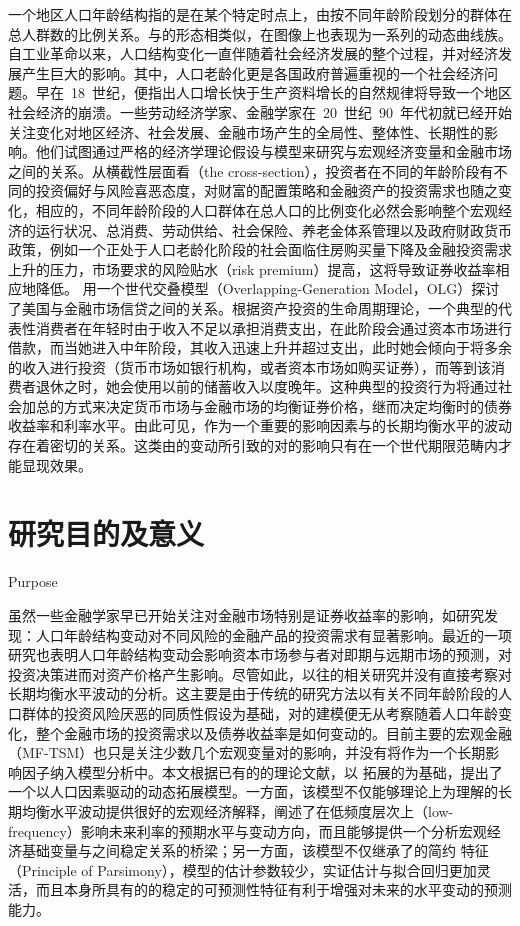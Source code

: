 一个地区人口年龄结构指的是在某个特定时点上，由按不同年龄阶段划分的群体在总人群数的比例关系。与\ts 的形态相类似，\ds 在图像上也表现为一系列的动态曲线族。自工业革命以来，人口结构变化一直伴随着社会经济发展的整个过程，并对经济发展产生巨大的影响。其中，人口老龄化更是各国政府普遍重视的一个社会经济问题。早在~18~世纪，便指出人口增长快于生产资料增长的自然规律将导致一个地区社会经济的崩溃。一些劳动经济学家、金融学家在~20~世纪~90~年代初就已经开始关注\ds 变化对地区经济、社会发展、金融市场产生的全局性、整体性、长期性的影响。他们试图通过严格的经济学理论假设与模型来研究\ds 与宏观经济变量和金融市场之间的关系。从横截性层面看（the cross-section），投资者在不同的年龄阶段有不同的投资偏好与风险喜恶态度，对财富的配置策略和金融资产的投资需求也随之变化，相应的，不同年龄阶段的人口群体在总人口的比例变化必然会影响整个宏观经济的运行状况、总消费、劳动供给、社会保险、养老金体系管理以及政府财政货币政策，例如一个正处于人口老龄化阶段的社会面临住房购买量下降及金融投资需求上升的压力，市场要求的风险贴水（risk premium）提高，这将导致证券收益率相应地降低\citep{bakshi1994baby}。 用一个世代交叠模型（Overlapping-Generation Model，OLG）探讨了美国\ds 与金融市场信贷之间的关系。根据资产投资的生命周期理论\citep{modigliani1954utility}，一个典型的代表性消费者在年轻时由于收入不足以承担消费支出，在此阶段会通过资本市场进行借款，而当她进入中年阶段，其收入迅速上升并超过支出，此时她会倾向于将多余的收入进行投资（货币市场如银行机构，或者资本市场如购买证券），而等到该消费者退休之时，她会使用以前的储蓄收入以度晚年。这种典型的投资行为将通过社会加总的方式来决定货币市场与金融市场的均衡证券价格，继而决定均衡时的债券收益率和利率水平。由此可见，\ds 作为一个重要的影响因素与\ts 的长期均衡水平的波动存在着密切的关系。这类由\ds 的变动所引致的对\tsm 的影响只有在一个世代期限范畴内才能显现效果。

\section{研究目的及意义}{Purpose}

虽然一些金融学家早已开始关注\dsf 对金融市场特别是证券收益率的影响，如研究发现：人口年龄结构变动对不同风险的金融产品的投资需求有显著影响。最近的一项研究也表明人口年龄结构变动会影响资本市场参与者对即期与远期市场的预测，对投资决策进而对资产价格产生影响。尽管如此，以往\tsm 的相关研究并没有直接考察\ds 对\ts 长期均衡水平波动的分析。这主要是由于传统\tsm 的研究方法以有关不同年龄阶段的人口群体的投资风险厌恶的同质性假设为基础，对\ts 的建模便无从考察随着人口年龄变化，整个金融市场的投资需求以及债券收益率是如何变动的。目前主要的宏观金融\tsm （MF-TSM）也只是关注少数几个宏观变量对\ts 的影响，并没有将\ds 作为一个长期影响因子纳入模型分析中。本文根据已有的\tsm 的理论文献，以 拓展的\dns 为基础，提出了一个以人口因素驱动的动态\ts 拓展模型。一方面，该模型不仅能够理论上为理解\ts 的长期均衡水平波动提供很好的宏观经济解释，阐述了\dsf 在低频度层次上（low-frequency）影响未来利率的预期水平与变动方向，而且能够提供一个分析宏观经济基础变量与\ts 之间稳定关系的桥梁；另一方面，该模型不仅继承了\dns 的简约 特征（Principle of Parsimony），模型的估计参数较少，实证估计与拟合回归更加灵活，而且\dsf 本身所具有的的稳定的可预测性特征有利于增强对未来\ts 的水平变动的预测能力。

